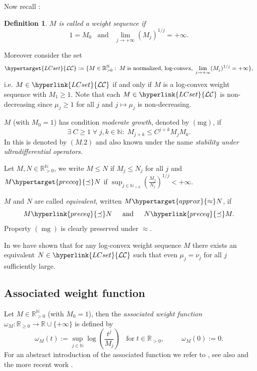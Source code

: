 \documentclass[10pt]{amsart}%
\numberwithin{equation}{section}
\theoremstyle{plain}
\newtheorem{definition}[proposition]{Definition}
\newcommand{\RR}{\mathbb{R}}
\newcommand{\NN}{\mathbb{N}}
\let\on=\operatorname
\begin{document}
Now recall \cite[Def. 2.4]{weightedentirecharacterization}:

\begin{definition}\label{defweightsequ}
$M$ is called a {\itshape weight sequence} if
$$1=M_0\;\;\;\text{and}\;\;\;\lim_{j\rightarrow+\infty}(M_j)^{1/j}=+\infty.$$
\end{definition}

Moreover consider the set
$$\hypertarget{LCset}{\mathcal{LC}}:=\{M\in\RR_{>0}^{\NN}:\;M\;\text{is normalized, log-convex},\;\lim_{j\rightarrow+\infty}(M_j)^{1/j}=+\infty\},$$
i.e. $M\in\hyperlink{LCset}{\mathcal{LC}}$ if and only if $M$ is a log-convex weight sequence with $M_1\ge 1$. Note that each $M\in\hyperlink{LCset}{\mathcal{LC}}$ is non-decreasing since $\mu_j\ge 1$ for all $j$ and $j\mapsto\mu_j$ is non-decreasing.\vspace{6pt}

$M$ (with $M_0=1$) has condition {\itshape moderate growth}, denoted by \hypertarget{mg}{$(\text{mg})$}, if
$$\exists\;C\ge 1\;\forall\;j,k\in\NN:\;M_{j+k}\le C^{j+k} M_j M_k.$$
In \cite{Komatsu73} this is denoted by $(M.2)$ and also known under the name {\itshape stability under ultradifferential operators.}\vspace{6pt}

Let $M,N\in\RR_{>0}^{\NN}$, we write $M\le N$ if $M_j\le N_j$ for all $j$ and $M\hypertarget{preceq}{\preceq}N$ if $\sup_{j\in\NN_{>0}}\left(\frac{M_j}{N_j}\right)^{1/j}<+\infty$.

$M$ and $N$ are called {\itshape equivalent}, written $M\hypertarget{approx}{\approx}N$, if
$$M\hyperlink{preceq}{\preceq}N\hspace{15pt}\text{and}\hspace{15pt}N\hyperlink{preceq}{\preceq}M.$$
Property \hyperlink{mg}{$(\on{mg})$} is clearly preserved under \hyperlink{approx}{$\approx$}.

In \cite[Rem. 2.5]{weightedentirecharacterization} we have shown that for any log-convex weight sequence $M$ there exists an equivalent $N\in\hyperlink{LCset}{\mathcal{LC}}$ such that even $\mu_j=\nu_j$ for all $j$ sufficiently large.

\subsection{Associated weight function}\label{assofctsect}
Let $M\in\RR_{>0}^{\NN}$ (with $M_0=1$), then the {\itshape associated weight function} $\omega_M: \RR_{\ge 0}\rightarrow\RR\cup\{+\infty\}$ is defined by
\begin{equation*}\label{assofunc}
\omega_M(t):=\sup_{j\in\NN}\log\left(\frac{t^j}{M_j}\right)\;\;\;\text{for}\;t\in\RR_{>0},\hspace{30pt}\omega_M(0):=0.
\end{equation*}
For an abstract introduction of the associated function we refer to \cite[Chapitre I]{mandelbrojtbook}, see also \cite[Definition 3.1]{Komatsu73} and the more recent work \cite{regularnew}.
\end{document}

